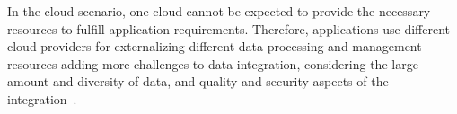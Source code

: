 \documentclass[11pt,a4paper,oneside]{report}
\begin{document}
In the cloud scenario, one cloud cannot be expected to provide the necessary resources to fulfill application requirements. 
Therefore, applications use different cloud providers for externalizing different data processing and management resources
adding more challenges to data integration, considering the large amount and diversity of data, and quality and security aspects of the integration~\cite{Dustdar:2012}.
\end{document}
